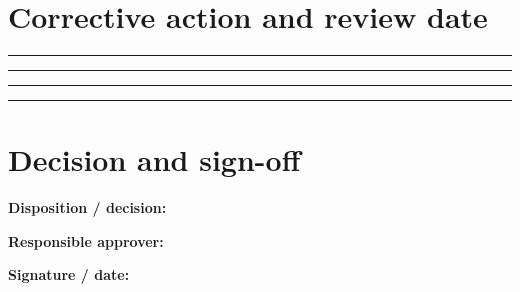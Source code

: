 \documentclass[10pt,letterpaper]{article}
\begin{document}
\section{Corrective action and review date}
\noindent\rule{\linewidth}{0.4pt}\par\vspace{16pt}
\noindent\rule{\linewidth}{0.4pt}\par\vspace{16pt}
\noindent\rule{\linewidth}{0.4pt}\par\vspace{16pt}
\noindent\rule{\linewidth}{0.4pt}\par\vspace{16pt}
\section{Decision and sign-off}
\noindent\textbf{Disposition / decision:}\quad\hrulefill\par\vspace{11pt}
\noindent\textbf{Responsible approver:}\quad\hrulefill\par\vspace{11pt}
\noindent\textbf{Signature / date:}\quad\hrulefill\par\vspace{11pt}
\end{document}

